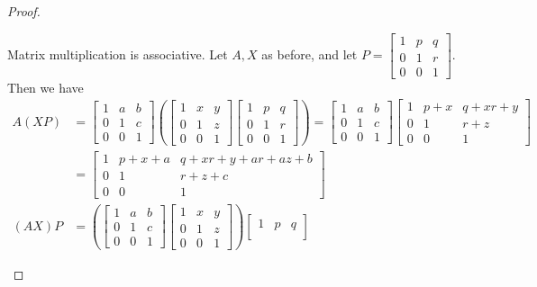 \documentclass{article}
\begin{document}
\begin{itemize}
\begin{proof}
\begin{enumerate}
			\ii Matrix multiplication is associative. Let $A, X$ as before, and let $P=\begin{bmatrix}
				1 & p & q \\
				0 & 1 & r \\
				0 & 0 & 1
			\end{bmatrix}.$ Then we have
			\begin{align*}
				A(XP) &= \begin{bmatrix}
					1 & a & b \\
					0 & 1 & c \\
					0 & 0 & 1
				\end{bmatrix} \left( \begin{bmatrix}
					1 & x & y \\
					0 & 1 & z \\
					0 & 0 & 1
				\end{bmatrix} \begin{bmatrix}
					1 & p & q \\
					0 & 1 & r \\
					0 & 0 & 1
				\end{bmatrix} \right) = \begin{bmatrix}
					1 & a & b \\
					0 & 1 & c \\
					0 & 0 & 1
				\end{bmatrix} \begin{bmatrix}
					1 & p+x & q+xr+y \\
					0 & 1 & r+z \\
					0 & 0 & 1
				\end{bmatrix} \\
				&= \begin{bmatrix}
					1 & p+x+a & q+xr+y+ar+az+b \\
					0 & 1 & r+z+c \\
					0 & 0 & 1
				\end{bmatrix} \\
				(AX)P &= \left(\begin{bmatrix}
					1 & a & b \\
					0 & 1 & c \\
					0 & 0 & 1
				\end{bmatrix} \begin{bmatrix}
					1 & x & y \\
					0 & 1 & z \\
					0 & 0 & 1
				\end{bmatrix} \right) \begin{bmatrix}
					1 & p & q \\

\end{bmatrix}
\end{align*}
\end{enumerate}
\end{proof}
\end{itemize}
\end{document}
